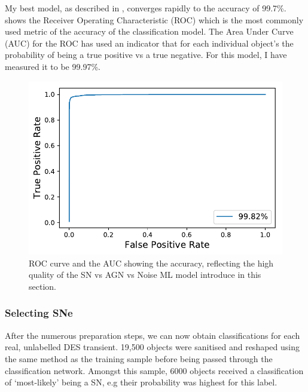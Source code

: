 My best model, as described in , converges rapidly to the accuracy of 99.7\%.  shows the Receiver Operating Characteristic (ROC) which is the most commonly used metric of the accuracy of the classification model. The Area Under Curve (AUC) for the ROC has used an indicator that for each individual object's the probability of being a true positive vs a true negative. For this model, I have measured it to be 99.97\%.

\begin{figure}
  \includegraphics[width=\textwidth]{Figures/Chapter5/SNAGNNoiseROC.pdf}
  \caption{ROC curve and the AUC showing the accuracy, reflecting the high quality of the SN vs AGN vs Noise ML model introduce in this section.}
  \label{fig:AGNNoiseROC}
\end{figure}

\subsubsection{Selecting SNe}
After the numerous preparation steps, we can now obtain classifications for each real, unlabelled DES transient. 19,500 objects were sanitised and reshaped using the same method as the training sample before being passed through the classification network. Amongst this sample, 6000 objects received a classification of `most-likely' being a SN, e.g their probability was highest for this label.

